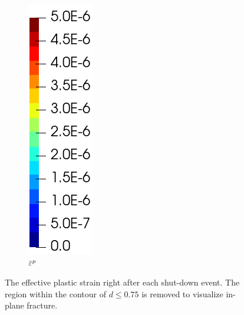 \begin{figure}[!htb]
\begin{subfigure}{0.08\textwidth}
  \end{subfigure}
  \begin{subfigure}{0.1\textwidth}
    \centering
    \caption*{$\ep$}
    \includegraphics[width=\textwidth]{Chapter5/figures/spallation/colorbar_ep}
  \end{subfigure}
  \caption[The effective plastic strain right after each shut-down event.]{The effective plastic strain right after each shut-down event. The region within the contour of $d \leqslant 0.75$ is removed to visualize in-plane fracture.}
  \label{fig: Chapter5/spallation/animation_ep}
\end{figure}
